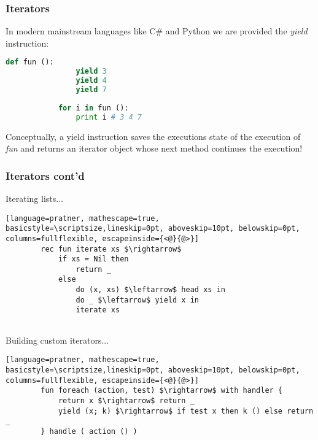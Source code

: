 \documentclass[t]{beamer}
\begin{document}
	\begin{frame}[fragile]
		\frametitle{Iterators}
		
		In modern mainstream languages like C\# and Python we are provided the \textit{yield} instruction:
		
		\begin{lstlisting}[language=python, mathescape=true, basicstyle=\scriptsize,lineskip=-2pt, aboveskip=10pt, belowskip=0pt, columns=fullflexible]
			def fun ():
				yield 3
				yield 4
				yield 7
				
			for i in fun ():
				print i # 3 4 7
		\end{lstlisting}
		
		Conceptually, a yield instruction saves the executions state of the execution of \textit{fun} and returns an iterator object whose next method \alert{continues} the execution!
\end{frame}

\begin{frame}[fragile]
	\frametitle{Iterators cont'd}
	
	Iterating lists...
	
	\begin{lstlisting}[language=pratner, mathescape=true, basicstyle=\scriptsize,lineskip=0pt, aboveskip=10pt, belowskip=0pt, columns=fullflexible, escapeinside={<@}{@>}]
		rec fun iterate xs $\rightarrow$ 
			if xs = Nil then 
			    return _ 
			else
			    do (x, xs) $\leftarrow$ head xs in
			    do _ $\leftarrow$ yield x in
			    iterate xs
		
	\end{lstlisting}  
	
	Building custom iterators...
	
	\begin{lstlisting}[language=pratner, mathescape=true, basicstyle=\scriptsize,lineskip=0pt, aboveskip=10pt, belowskip=0pt, columns=fullflexible, escapeinside={<@}{@>}]
		fun foreach (action, test) $\rightarrow$ with handler {
			return x $\rightarrow$ return _
			yield (x; k) $\rightarrow$ if test x then k () else return _
		} handle ( action () )
	\end{lstlisting}  
\end{frame}
\end{document}
